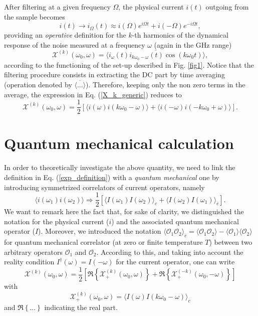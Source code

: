 \documentclass[twocolumn,showpacs,preprintnumbers,amsmath,amssymb%
 aps,
 prb,
 lengthcheck,%
]{revtex4-1}
\def\be{\begin{equation}}
\def\ee{\end{equation}}
\begin{document}
After filtering at a given frequency $\Omega$, the physical current $i(t)$ outgoing from the sample becomes 
\be
i(t)\rightarrow i_{\Omega}(t)\approx  i (\Omega) e^{i \Omega t}+ i (-\Omega) e^{-i \Omega t},   
\ee
providing an \emph{operative} definition for the $k$-th harmonics of the dynamical response of the noise measured at a frequency $\omega$ (again in the GHz range)
\be
\mathcal{X}^{(k)}(\omega_{0}, \omega)= \langle \overline{i_{\omega}(t) i_{k\omega_{0}-\omega}(t) \cos(k \omega_{0}t)} \rangle,
\label{X_k_generic} 
\ee
according to the functioning of the set-up described in Fig. \ref{fig1}. \cite{gabelli_noise_2008}  Notice that the filtering procedure consists in extracting the DC part by time averaging (operation denoted by $\overline{\langle ... \rangle}$). Therefore, keeping only the non zero terms in the average, the expression in Eq. (\ref{X_k_generic}) reduces to
\be
\mathcal{X}^{(k)}(\omega_{0}, \omega)= \frac{1}{2} \left[\langle i (\omega) i(k \omega_{0}-\omega)\rangle+\langle i (-\omega) i(-k\omega_{0}+\omega) \rangle\right].
\label{exp_definition}
\ee
 
\section{Quantum mechanical calculation}\label{Calculation}
In order to theoretically investigate the above quantity, we need to link the definition in Eq. (\ref{exp_definition}) with a \emph{quantum mechanical} one by introducing symmetrized correlators of current operators, namely \cite{gabelli_noise_2008, ferraro_multiple_2014}
\be
\langle i (\omega_{1}) i (\omega_{2})\rangle\Rightarrow \frac{1}{2} \left[\langle I(\omega_{1}) I(\omega_{2})\rangle_{c}+\langle I(\omega_{2}) I(\omega_{1})\rangle_{c} \right]. 
\ee 
We want to remark here the fact that, for sake of clarity, we distinguished the notation for the physical current ($i$) and the associated quantum mechanical operator ($I$). Moreover, we introduced the notation $\langle \mathcal{O}_{1} \mathcal{O}_{2}\rangle_{c}=\langle \mathcal{O}_{1} \mathcal{O}_{2}\rangle-\langle \mathcal{O}_{1} \rangle\langle \mathcal{O}_{2}\rangle$ for quantum mechanical correlator (at zero or finite temperature $T$) between two arbitrary operators $\mathcal{O}_{1}$ and $\mathcal{O}_{2}$. According to this, and taking into account the reality condition $I^{\dagger}(\omega)=I(-\omega)$ for the current operator, one can write  
\be
\mathcal{X}^{(k)}(\omega_{0}, \omega)= \frac{1}{2} \left[\Re\left\{\mathcal{X}^{(k)}_{+}(\omega_{0}, \omega)\right\}+\Re\left\{\mathcal{X}^{(-k)}_{+}(\omega_{0}, -\omega)\right\}\right] \label{Xp}
\ee
with
\be
\mathcal{X}^{(k)}_{+}(\omega_{0}, \omega)=\langle I(\omega) I(k\omega_{0}-\omega) \rangle_{c}
\ee
and $\Re\left\{...\right\}$ indicating the real part.
 
\end{document}
